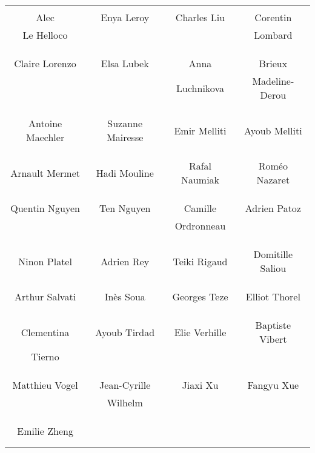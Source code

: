 \begin{center}
\begin{tabular}{cccc}
&&& \\
Alec & Enya Leroy & Charles Liu & Corentin \\ Le Helloco & & & Lombard \\ \\ \\

&&& \\
Claire Lorenzo & Elsa Lubek & Anna & Brieux \\ & & Luchnikova & Madeline-Derou \\ \\ \\

&&& \\
Antoine Maechler & Suzanne Mairesse & Emir Melliti & Ayoub Melliti \\ \\ \\

&&& \\
Arnault Mermet & Hadi Mouline & Rafal Naumiak & Roméo Nazaret \\ \\ \\

&&& \\
Quentin Nguyen & Ten Nguyen & Camille & Adrien Patoz \\ & & Ordronneau &  \\ \\ \\

&&& \\
Ninon Platel & Adrien Rey & Teiki Rigaud & Domitille Saliou \\ \\ \\

&&& \\
Arthur Salvati & Inès Soua & Georges Teze & Elliot Thorel \\ \\ \\

&&& \\
Clementina & Ayoub Tirdad & Elie Verhille & Baptiste Vibert \\ Tierno \\ \\ \\

&&& \\
Matthieu Vogel & Jean-Cyrille & Jiaxi Xu & Fangyu Xue \\ & Wilhelm & &\\ \\ \\

 \\
Emilie Zheng  \\ \\ \\

\end{tabular}
\end{center}